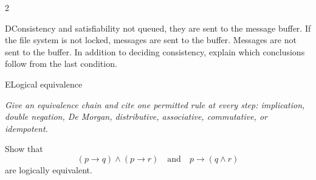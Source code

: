 \documentclass[9pt]{extarticle}
\begin{document}
\begin{multicols}{2}
\begin{CoreProblem}{D}{Consistency and satisfiability}
not queued, they are sent to the message buffer. If the file system is not
locked, messages are sent to the buffer. Messages are not sent to the buffer.
In addition to deciding consistency, explain which conclusions follow from the
last condition.
\end{CoreProblem}
\begin{CoreProblem}{E}{Logical equivalence}
{\scriptsize\textit{Give an equivalence chain and cite one permitted rule at every step: implication, double negation, De Morgan, distributive, associative, commutative, or idempotent.}\par}
Show that
\[
  (p\to q)\land(p\to r)
  \quad\text{and}\quad
  p\to(q\land r)
\]
are logically equivalent.
\end{CoreProblem}
\end{multicols}
\CoreWorkArea
\FormBreak
{}
\end{document}
